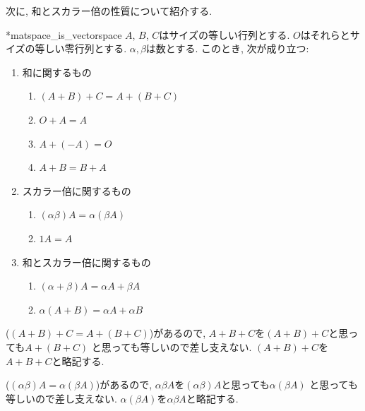 次に, 和とスカラー倍の性質について紹介する.
\begin{prop}
  \provelater**{matspace_is_vectorspace}
  $A$, $B$, $C$はサイズの等しい行列とする.
  $O$はそれらとサイズの等しい零行列とする.
  $\alpha,\beta$は数とする.
  このとき, 次が成り立つ:
  \begin{enumerate}
  \item 和に関するもの
  \begin{enumerate}
  \item {}
    \label{item:sum:c}
    $(A+B)+C=A+(B+C)$
  \item {}
    $O+A=A$
  \item {}
    $A+(-A)=O$
  \item {}
    $A+B=B+A$
  \end{enumerate}
  \item スカラー倍に関するもの
  \begin{enumerate}
  \item {}
    \label{item:sc:c}
    $(\alpha\beta)A=\alpha(\beta A)$
  \item {}
    $1A=A$
  \end{enumerate}  
  \item 和とスカラー倍に関するもの
  \begin{enumerate}
  \item {}
    $(\alpha+\beta)A=\alpha A+\beta A$
  \item {}
    $\alpha (A+B)=\alpha A+\alpha B$
  \end{enumerate}  
  \end{enumerate}
\end{prop}
\begin{remark}
  ($(A+B)+C=A+(B+C)$)があるので,
  $A+B+C$を$(A+B)+C$と思っても$A+(B+C)$
  と思っても等しいので差し支えない.
  $(A+B)+C$を$A+B+C$と略記する.
\end{remark}
\begin{remark}
  ($(\alpha\beta)A=\alpha(\beta A)$)があるので,
  $\alpha\beta A$を$(\alpha\beta)A$と思っても$\alpha(\beta A)$
  と思っても等しいので差し支えない.
  $\alpha(\beta A)$を$\alpha\beta A$と略記する.
\end{remark}

